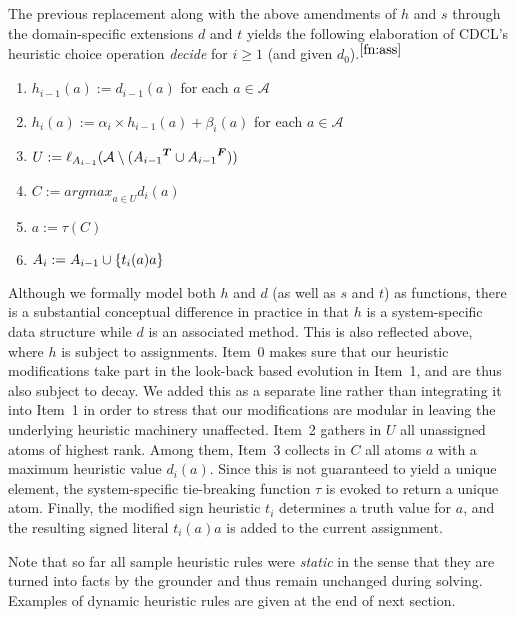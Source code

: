 The previous replacement along with the above amendments of $h$ and $s$ through the domain-specific extensions $d$ and $t$
yields the following elaboration of CDCL's heuristic choice operation \textit{decide} for $i\geq 1$ (and given $d_0$).$^{\ref{fn:ass}}$
\begin{enumerate}\addtocounter{enumi}{-1}\itemindent 10pt
\item $h_{i-1}(a) := d_{i-1}(a)$                         \hfill for each $a\in\mathcal{A}\qquad$
\item $h_i(a) := \alpha_i\times h_{i-1}(a) + \beta_i(a)$ \hfill for each $a\in\mathcal{A}\qquad$
\item $U:=\ell_{A_{i-1}}(\mathcal{A}\setminus ({A_{i-1}}^{\boldsymbol{T}}\cup{\ensuremath{A}_{i-1}}^{\boldsymbol{F}}))$
\item $C:= \textit{argmax}_{a\in U}d_i(a)$
\item $a:= \tau(C)$
\item $A_i := A_{i-1}\cup\{t_i(a)a\}$
\end{enumerate}
Although we formally model both $h$ and $d$ (as well as $s$ and $t$) as functions,
there is a substantial conceptual difference in practice in that $h$ is a system-specific data structure while $d$ is an associated method.
This is also reflected above, where $h$ is subject to assignments.
%
Item~0 makes sure that our heuristic modifications take part in the look-back based evolution in Item~1,
and are thus also subject to decay.
We added this as a separate line rather than integrating it into Item~1 in order to stress that our
modifications are modular in leaving the underlying heuristic machinery unaffected.
%
Item~2 gathers in $U$ all unassigned atoms of highest rank.
%
Among them, Item~3 collects in $C$ all atoms $a$ with a maximum heuristic value $d_i(a)$.
%
Since this is not guaranteed to yield a unique element, the system-specific tie-breaking function
$\tau$ is evoked to return a unique atom.
%
Finally, the modified sign heuristic $t_i$ determines a truth value for $a$, and the resulting
signed literal ${t_i(a)a}$ is added to the current assignment.

Note that so far all sample heuristic rules were \emph{static} in the sense that they are turned into
facts by the grounder and thus remain unchanged during solving.
Examples of dynamic heuristic rules are given at the end of next section.

